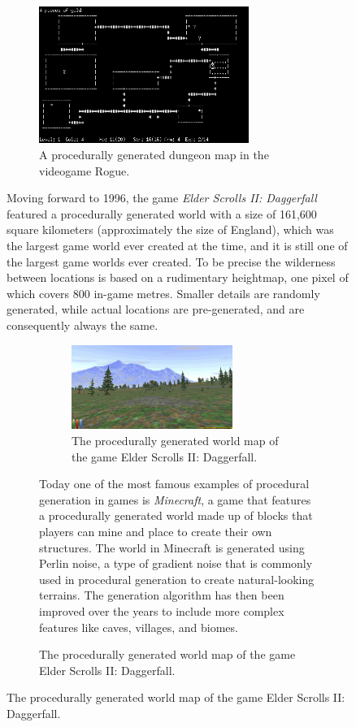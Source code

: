 \documentclass{article}
\begin{document}
\begin{figure}[H]
\begin{figure}[H]
	\centering
	\includegraphics[width=0.75\textwidth]{img/rogue.png}
	\caption{A procedurally generated dungeon map in the videogame Rogue.}
	\label{fig:nethack}
\end{figure}

Moving forward to 1996, the game \textit{Elder Scrolls II: Daggerfall} featured a procedurally
generated world with a size of 161,600 square kilometers (approximately the size of England), which
was the largest game world ever created at the time, and it is still one of the largest game worlds
ever created. To be precise the wilderness between locations is based on a rudimentary heightmap,
one pixel of which covers 800 in-game metres. Smaller details are randomly generated, while actual
locations are pre-generated, and are consequently always the same.

\begin{figure}[H]
\begin{figure}[H]
	\centering
	\includegraphics[width=0.75\textwidth]{img/daggerfall.png}
	\caption{The procedurally generated world map of the game Elder Scrolls II: Daggerfall.}
	\label{fig:daggerfall}
\end{figure}

Today one of the most famous examples of procedural generation in games is \textit{Minecraft}, a
game that features a procedurally generated world made up of blocks that players can mine and place
to create their own structures. The world in Minecraft is generated using Perlin noise, a type of
gradient noise that is commonly used in procedural generation to create natural-looking terrains.
The generation algorithm has then been improved over the years to include more complex features
like caves, villages, and biomes.


\end{figure}
\end{figure}
\end{document}
